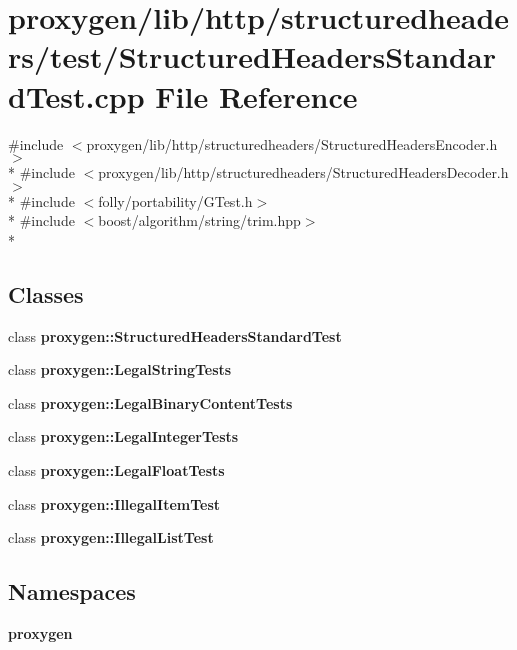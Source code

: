 \section{proxygen/lib/http/structuredheaders/test/\+Structured\+Headers\+Standard\+Test.cpp File Reference}
\label{StructuredHeadersStandardTest_8cpp}
{\ttfamily \#include $<$proxygen/lib/http/structuredheaders/\+Structured\+Headers\+Encoder.\+h$>$}\\*
{\ttfamily \#include $<$proxygen/lib/http/structuredheaders/\+Structured\+Headers\+Decoder.\+h$>$}\\*
{\ttfamily \#include $<$folly/portability/\+G\+Test.\+h$>$}\\*
{\ttfamily \#include $<$boost/algorithm/string/trim.\+hpp$>$}\\*
\subsection*{Classes}
\begin{DoxyCompactItemize}
\item 
class {\bf proxygen\+::\+Structured\+Headers\+Standard\+Test}
\item 
class {\bf proxygen\+::\+Legal\+String\+Tests}
\item 
class {\bf proxygen\+::\+Legal\+Binary\+Content\+Tests}
\item 
class {\bf proxygen\+::\+Legal\+Integer\+Tests}
\item 
class {\bf proxygen\+::\+Legal\+Float\+Tests}
\item 
class {\bf proxygen\+::\+Illegal\+Item\+Test}
\item 
class {\bf proxygen\+::\+Illegal\+List\+Test}
\end{DoxyCompactItemize}
\subsection*{Namespaces}
\begin{DoxyCompactItemize}
\item 
 {\bf proxygen}
\end{DoxyCompactItemize}
